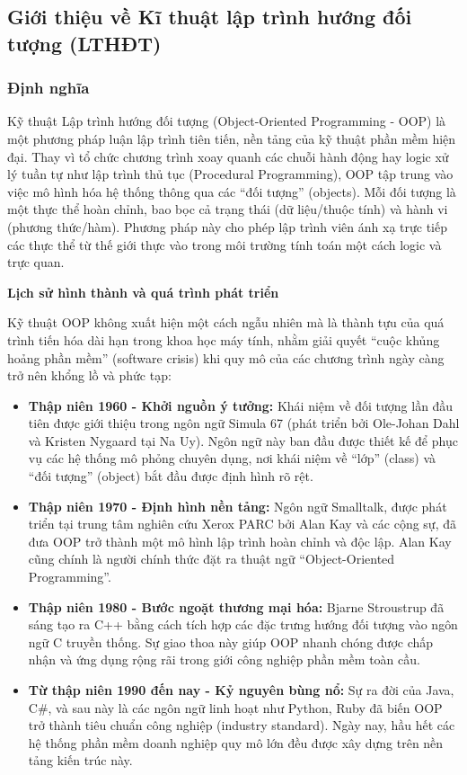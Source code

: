 \documentclass[12pt,a4paper]{article}
\begin{document}
\subsection{Giới thiệu về Kĩ thuật lập trình hướng đối tượng (LTHĐT)}
\subsubsection{Định nghĩa}

Kỹ thuật Lập trình hướng đối tượng (Object-Oriented Programming - OOP) là một phương pháp luận lập trình tiên tiến, nền tảng của kỹ thuật phần mềm hiện đại. Thay vì tổ chức chương trình xoay quanh các chuỗi hành động hay logic xử lý tuần tự như lập trình thủ tục (Procedural Programming), OOP tập trung vào việc mô hình hóa hệ thống thông qua các ``đối tượng'' (objects). Mỗi đối tượng là một thực thể hoàn chỉnh, bao bọc cả trạng thái (dữ liệu/thuộc tính) và hành vi (phương thức/hàm). Phương pháp này cho phép lập trình viên ánh xạ trực tiếp các thực thể từ thế giới thực vào trong môi trường tính toán một cách logic và trực quan.

\vspace{0.5em}
\noindent\textbf{Lịch sử hình thành và quá trình phát triển}

Kỹ thuật OOP không xuất hiện một cách ngẫu nhiên mà là thành tựu của quá trình tiến hóa dài hạn trong khoa học máy tính, nhằm giải quyết ``cuộc khủng hoảng phần mềm'' (software crisis) khi quy mô của các chương trình ngày càng trở nên khổng lồ và phức tạp:

\begin{itemize}[label={\scalebox{1.2}{$\circ$}}, leftmargin=2em]
    \item \textbf{Thập niên 1960 - Khởi nguồn ý tưởng:} Khái niệm về đối tượng lần đầu tiên được giới thiệu trong ngôn ngữ Simula 67 (phát triển bởi Ole-Johan Dahl và Kristen Nygaard tại Na Uy). Ngôn ngữ này ban đầu được thiết kế để phục vụ các hệ thống mô phỏng chuyên dụng, nơi khái niệm về ``lớp'' (class) và ``đối tượng'' (object) bắt đầu được định hình rõ rệt.
    \item \textbf{Thập niên 1970 - Định hình nền tảng:} Ngôn ngữ Smalltalk, được phát triển tại trung tâm nghiên cứu Xerox PARC bởi Alan Kay và các cộng sự, đã đưa OOP trở thành một mô hình lập trình hoàn chỉnh và độc lập. Alan Kay cũng chính là người chính thức đặt ra thuật ngữ ``Object-Oriented Programming''.
    \item \textbf{Thập niên 1980 - Bước ngoặt thương mại hóa:} Bjarne Stroustrup đã sáng tạo ra C++ bằng cách tích hợp các đặc trưng hướng đối tượng vào ngôn ngữ C truyền thống. Sự giao thoa này giúp OOP nhanh chóng được chấp nhận và ứng dụng rộng rãi trong giới công nghiệp phần mềm toàn cầu.
    \item \textbf{Từ thập niên 1990 đến nay - Kỷ nguyên bùng nổ:} Sự ra đời của Java, C\#, và sau này là các ngôn ngữ linh hoạt như Python, Ruby đã biến OOP trở thành tiêu chuẩn công nghiệp (industry standard). Ngày nay, hầu hết các hệ thống phần mềm doanh nghiệp quy mô lớn đều được xây dựng trên nền tảng kiến trúc này.
\end{itemize}
\end{document}
